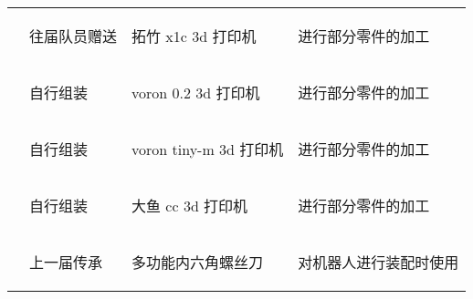 \begin{longtable}{ X | X | X | X }
    \cline{2-4}

    &
        \begin{center}
            往届队员赠送
        \end{center}&
        \begin{center}
            拓竹 x1c 3d 打印机
        \end{center}&
        \begin{center}
            进行部分零件的加工
        \end{center}\\
    
    \cline{2-4}

    &
        \begin{center}
            自行组装
        \end{center}&
        \begin{center}
            voron 0.2 3d 打印机
        \end{center}&
        \begin{center}
            进行部分零件的加工
        \end{center}\\
    
    \cline{2-4}

    &
        \begin{center}
            自行组装
        \end{center}&
        \begin{center}
            voron tiny-m 3d 打印机
        \end{center}&
        \begin{center}
            进行部分零件的加工
        \end{center}\\
    
    \cline{2-4}

    &
        \begin{center}
            自行组装
        \end{center}&
        \begin{center}
            大鱼 cc 3d 打印机
        \end{center}&
        \begin{center}
            进行部分零件的加工
        \end{center}\\
    
    \cline{2-4}

    &
        \begin{center}
            上一届传承
        \end{center}&
        \begin{center}
            多功能内六角螺丝刀
        \end{center}&
        \begin{center}
            对机器人进行装配时使用
        \end{center}\\
    

\end{longtable}
